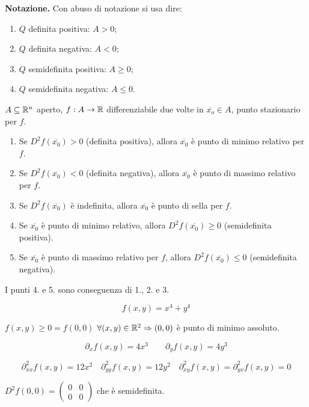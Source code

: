 \begin{attbar}
	\textbf{Notazione.} Con abuso di notazione si usa dire:
	\begin{enumerate}
		\item $Q$ definita positiva: $A >0$; 
		\item $Q$ definita negativa: $A<0$;
		\item $Q$ semidefinita positiva: $A \geq 0$;
		\item $Q$ semidefinita negativa: $A \leq 0$.
	\end{enumerate}
\end{attbar}


\begin{theorem}
	
	\label{th: pag 385}
	$A \subseteq \mathbb{R}^n$ aperto, $f:A \rightarrow  \mathbb{R}$ differenziabile due volte in $\overline{x_o}\in A$, punto stazionario per $f$.
	\begin{enumerate}
		\item Se $D^2f(\overline{x_0})>0 ${\color{blue} (definita positiva)}, allora $\overline{x_0}$ è punto di minimo relativo per $f$.
		\item Se $D^2f(\overline{x_0})<0${\color{blue} (definita negativa)}, allora $\overline{x_0}$ è punto di massimo relativo per $f$. 
		\item Se $D^2f(\overline{x_0})$ è indefinita, allora $\overline{x_0}$ è punto di sella per $f$.
		\item Se $\overline{x_0}$ è punto di minimo relativo, allora $D^2f(\overline{x_0})\geq0$ {\color{blue}(semidefinita positiva)}.
		\item Se $\overline{x_0}$ è punto di massimo relativo per $f$, allora $D^2f(\overline{x_0})\leq0$ {\color{blue}(semidefinita negativa)}.
	\end{enumerate}
\end{theorem}


\begin{attbar}
	I punti 4. e 5. sono conseguenza di 1., 2. e 3.
\end{attbar}


\begin{exbar}
	$$f(x,y)=x^4+y^4$$
	
	$f(x,y)\geq 0 = f(0,0)$ $\forall (x,y)\in \mathbb{R}^2 \Rightarrow (0,0)$ è punto di minimo assoluto.
	
	$$\partial_xf(x,y)=4x^3 \qquad \partial_yf(x,y)=4y^3$$
	
	$$\partial_{xx}^2f(x,y)=12x^2 \quad \partial_{yy}^2f(x,y)=12y^2 \quad \partial_{xy}^2f(x,y)=\partial_{yx}^2f(x,y)=0$$
	
	{\centering $D^2f(0,0)=\begin{pmatrix}
		0&0\\
		0&0
	\end{pmatrix}$
	che è semidefinita. \par}
\end{exbar}


